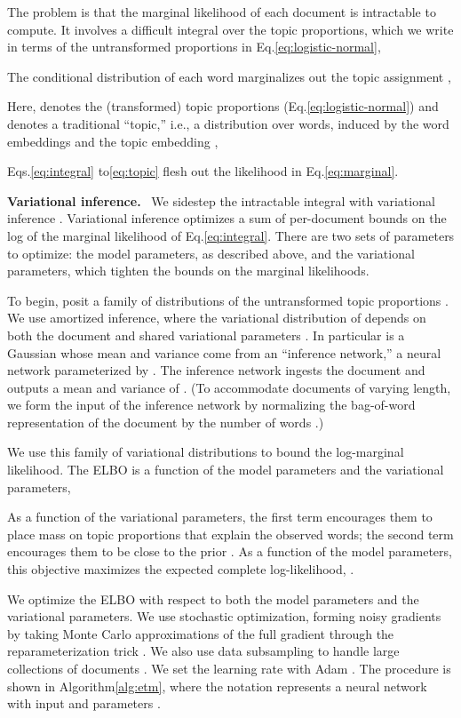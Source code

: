\documentclass[11pt,a4paper]{article}
\DeclareRobustCommand{\parhead}[1]{\noindent\textbf{#1}~}
\begin{document}
The problem is that the marginal likelihood of each document is
intractable to compute.  It involves a difficult integral over the
topic proportions, which we write in terms of the untransformed
proportions  in Eq.\nobreakspace \ref {eq:logistic-normal},

The conditional distribution of each word marginalizes out the topic
assignment ,

Here,  denotes the (transformed) topic proportions
(Eq.\nobreakspace \ref {eq:logistic-normal}) and  denotes a traditional
``topic,'' i.e., a distribution over words, induced by the word embeddings
 and the topic embedding ,

Eqs.\nobreakspace  \ref {eq:integral} to\nobreakspace  \ref {eq:topic}  flesh out the likelihood in
Eq.\nobreakspace \ref {eq:marginal}.

\parhead{Variational inference.} We sidestep the intractable integral
with variational inference \citep{Jordan1999,Blei2017}. Variational
inference optimizes a sum of per-document bounds on the log of the
marginal likelihood of Eq.\nobreakspace \ref {eq:integral}.  There are two sets of
parameters to optimize: the model parameters, as described above, and
the variational parameters, which tighten the bounds on the marginal
likelihoods.

To begin, posit a family of distributions of the untransformed topic
proportions .  We use amortized
inference, where the variational distribution of  depends on
both the document  and shared variational parameters .  In
particular  is a Gaussian whose mean and
variance come from an ``inference network,'' a neural network
parameterized by  \citep{kingma2014autoencoding}.
The inference network ingests the document  and outputs a
mean and variance of . (To accommodate documents of varying
length, we form the input of the inference network by normalizing the
bag-of-word representation of the document by the number of words .)

We use this family of variational distributions to bound the log-marginal
likelihood.  The \gls{ELBO} is a function of the model
parameters and the variational parameters,

As a function of the variational parameters, the first term encourages
them to place mass on topic proportions  that explain the
observed words; the second term encourages them to be close to the
prior .  As a function of the model parameters, this
objective maximizes the expected complete log-likelihood,
.

We optimize the \gls{ELBO} with respect to both the model parameters
and the variational parameters. We use stochastic optimization,
forming noisy gradients by taking Monte Carlo approximations of the
full gradient through the reparameterization trick
\citep{kingma2014autoencoding,Titsias2014_doubly,rezende2014stochastic}.
We also use data subsampling to handle large collections of documents
\citep{Hoffman2013}.  We set the learning rate with Adam \citep{Kingma2015}.
The procedure is shown in Algorithm\nobreakspace \ref {alg:etm}, where the notation
 represents a neural network with input
 and parameters .
\end{document}
